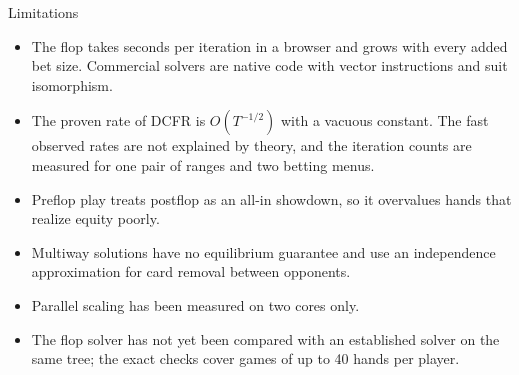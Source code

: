 \documentclass[10pt,aspectratio=169]{beamer}
\begin{document}
\begin{frame}{Limitations}
\begin{itemize}[<+->]\setlength\itemsep{4pt}
\item The flop takes seconds per iteration in a browser and grows with every added bet size. Commercial solvers are
native code with vector instructions and suit isomorphism.
\item The proven rate of DCFR is $O(T^{-1/2})$ with a vacuous constant. The fast observed rates are not explained by
theory, and the iteration counts are measured for one pair of ranges and two betting menus.
\item Preflop play treats postflop as an all-in showdown, so it overvalues hands that realize equity poorly.
\item Multiway solutions have no equilibrium guarantee and use an independence approximation for card removal
between opponents.
\item Parallel scaling has been measured on two cores only.
\item The flop solver has not yet been compared with an established solver on the same tree; the exact checks
cover games of up to 40 hands per player.
\end{itemize}
\end{frame}
\end{document}
